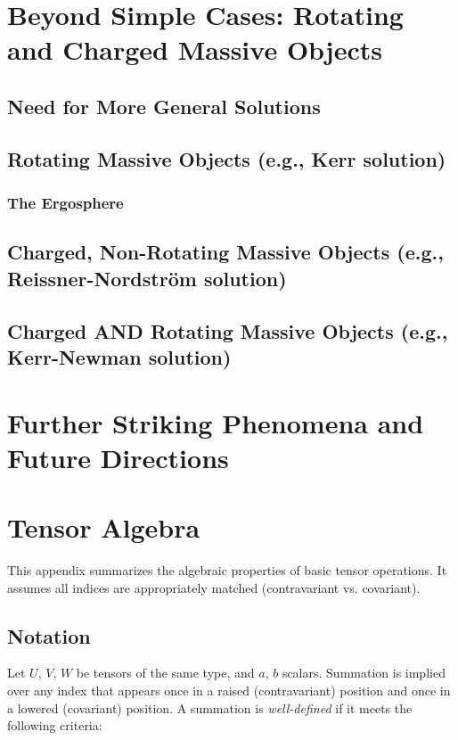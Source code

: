 \documentclass{amsart}
\theoremstyle{definition}
\theoremstyle{remark}
\begin{document}
\section{Beyond Simple Cases: Rotating and Charged Massive Objects}
\label{sec:kerr_etc}

\subsection{Need for More General Solutions}

\subsection{Rotating Massive Objects (e.g., Kerr solution)}
\subsubsection{The Ergosphere}

\subsection{Charged, Non-Rotating Massive Objects (e.g., Reissner-Nordström solution)}

\subsection{Charged AND Rotating Massive Objects (e.g., Kerr-Newman solution)}

\section{Further Striking Phenomena and Future Directions}
\label{sec:future_phenomena}

\appendix
\section{Tensor Algebra}
This appendix summarizes the algebraic properties of basic tensor operations. It assumes all indices are appropriately matched (contravariant vs. covariant).

\subsection*{Notation}
Let $U$, $V$, $W$ be tensors of the same type, and $a$, $b$ scalars. Summation is implied over any index that appears once in a raised (contravariant) position and once in a lowered (covariant) position. A summation is \emph{well-defined} if it meets the following criteria:
\end{document}
